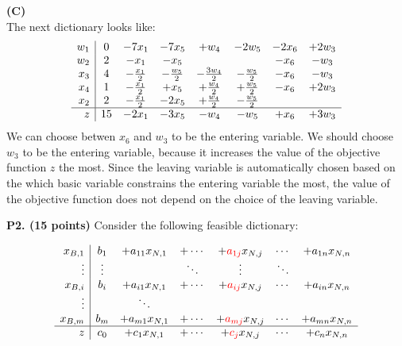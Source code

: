 \documentclass[11pt]{article}
\newcommand\red[1]{\textcolor{red}{#1}}
\begin{document}
\noindent\textbf{(C)}\\
The next dictionary looks like:
\[ \begin{array}{r| c c c c c c c}
w_1 & 0 &- 7x_1 &- 7x_5 &+ w_4 &- 2w_5 &- 2x_6 &+ 2w_3\\
w_2 & 2 & -x_1 & -x_5 & & & -x_6 & -w_3 \\
x_3 & 4 & -\frac{x_1}{2} & -\frac{w_5}{2} & -\frac{3w_4}{2} & -\frac{w_5}{2} & -x_6 & -w_3 \\
x_4 & 1 & -\frac{x_1}{2} & +x_5 & +\frac{w_4}{2} & +\frac{w_5}{2} & -x_6 & +2w_3 \\
x_2 & 2 & -\frac{x_1}{2} & -2x_5 & +\frac{w_4}{2} & -\frac{w_5}{2} && \\
\hline
z & 15 & -2x_1 & -3x_5 & -w_4 & -w_5 & +x_6 & +3w_3 \\
\end{array}\]
We can choose betwen $x_6$ and $w_3$ to be the entering variable.  We should choose $w_3$ to be the entering variable, because it increases the value of the objective function $z$ the most.  Since the leaving variable is automatically chosen based on the which basic variable constrains the entering variable the most, the value of the objective function does not depend on the choice of the leaving variable.

\medskip


\noindent\textbf{P2. (15 points)}  Consider the following feasible dictionary:

\[\begin{array}{r|c c c c c c c c}
x_{B,1} & b_1 & + a_{11} x_{N,1} & + \cdots & + \red{a_{1j}} x_{N,j} & \cdots & + a_{1n} x_{N,n}\\
\vdots & \vdots &  & \ddots & \vdots & \ddots  \\
x_{B,i} & b_i & +a_{i1} x_{N,1} & + \cdots & +\red{ a_{ij}} x_{N,j} & \cdots
                                                                & + a_{in} x_{N,n} \\
\vdots & & \ddots & \\ 
x_{B,m} & b_m & + a_{m1} x_{N,1} & + \cdots & +\red{ a_{mj} } x_{N,j} &
                                                                 \cdots  & + a_{mn} x_{N,n} \\
\hline
z & c_0 & + c_1 x_{N,1} & + \cdots & + \red{c_j} x_{N,j} & \cdots & + c_n x_{N,n}\\
\end{array}\]
\end{document}
